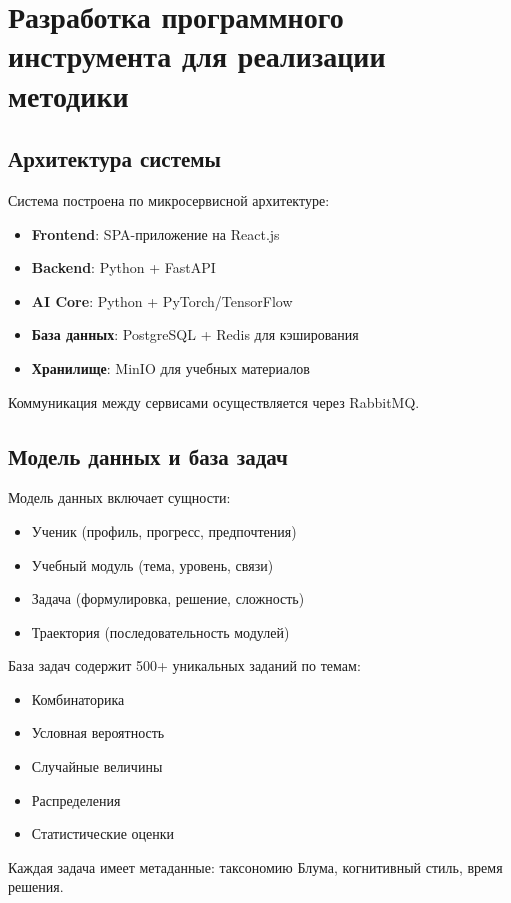 \documentclass[a4paper,14pt]{extreport}
\begin{document}
\chapter{Разработка программного инструмента для реализации методики}

\section{Архитектура системы}
Система построена по микросервисной архитектуре:
\begin{itemize}
    \item \textbf{Frontend}: SPA-приложение на React.js
    \item \textbf{Backend}: Python + FastAPI
    \item \textbf{AI Core}: Python + PyTorch/TensorFlow
    \item \textbf{База данных}: PostgreSQL + Redis для кэширования
    \item \textbf{Хранилище}: MinIO для учебных материалов
\end{itemize}
Коммуникация между сервисами осуществляется через RabbitMQ.

\section{Модель данных и база задач}
Модель данных включает сущности:
\begin{itemize}
    \item Ученик (профиль, прогресс, предпочтения)
    \item Учебный модуль (тема, уровень, связи)
    \item Задача (формулировка, решение, сложность)
    \item Траектория (последовательность модулей)
\end{itemize}
База задач содержит 500+ уникальных заданий по темам:
\begin{itemize}
    \item Комбинаторика
    \item Условная вероятность
    \item Случайные величины
    \item Распределения
    \item Статистические оценки
\end{itemize}
Каждая задача имеет метаданные: таксономию Блума, когнитивный стиль, время решения.
\end{document}
